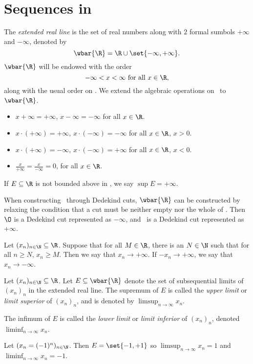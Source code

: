 \section{Sequences in \R} \label{sec:sequences:R}
\begin{definition} \label{def:sequences:R:extended}
    The \emph{extended real line} is the set of real numbers along with $2$
    formal sumbols $+\infty$ and $-\infty$, denoted by \[
        \wbar{\R} = \R \cup \set{-\infty, +\infty}.
    \]
    $\wbar{\R}$ will be endowed with the order \[
        -\infty < x < \infty \text{ for all } x \in \R,
    \] along with the usual order on \R.
    We extend the algebraic operations on \R\ to $\wbar{\R}$.
    \begin{itemize}
        \item $x + \infty = +\infty$, $x - \infty = -\infty$ for all
            $x \in \R$.
        \item $x \cdot (+\infty) = +\infty$, $x \cdot (-\infty) = -\infty$
            for all $x \in \R$, $x > 0$.
        \item $x \cdot (+\infty) = -\infty$, $x \cdot (-\infty) = +\infty$
            for all $x \in \R$, $x < 0$.
        \item $\frac{x}{+\infty} = \frac{x}{-\infty} = 0$, for all
            $x \in \R$.
    \end{itemize}
    If $E \subseteq \R$ is not bounded above in \R,
    we say $\sup E = +\infty$.
\end{definition}
When constructing \R\ through Dedekind cuts, $\wbar{\R}$ can be constructed
by relaxing the condition that a cut must be neither empty nor the whole of
\Q.
Then $\O$ is a Dedekind cut represented as $-\infty$,
and \Q\ is a Dedekind cut represented as $+\infty$.

\begin{definition}
    Let $(x_n)_{n \in \N} \subseteq \R$.
    Suppose that for all $M \in \R$, there is an $N \in \N$ such that for
    all $n \ge N$, $x_n \ge M$.
    Then we say that $x_n \to +\infty$.
    If $-x_n \to +\infty$, we say that $x_n \to -\infty$.
\end{definition}

\begin{definition}
    Let $(x_n)_{n \in \N} \subseteq \R$.
    Let $E \subseteq \wbar{\R}$ denote the set of subsequential limits of
    $(x_n)_n$ in the extended real line.
    The supremum of $E$ is called the \emph{upper limit} or \emph{limit
    superior} of $(x_n)_n$, and is denoted by $\limsup_{n \to \infty} x_n$.

    The infimum of $E$ is called the \emph{lower limit} or \emph{limit
    inferior} of $(x_n)_n$, denoted $\liminf_{n \to \infty} x_n$.
\end{definition}
\begin{example}
    Let $(x_n = (-1)^n)_{n \in \N}$.
    Then $E = \set{-1, +1}$ so $\limsup_{n \to \infty} x_n = 1$ and
    $\liminf_{n \to \infty} x_n = -1$.
\end{example}

